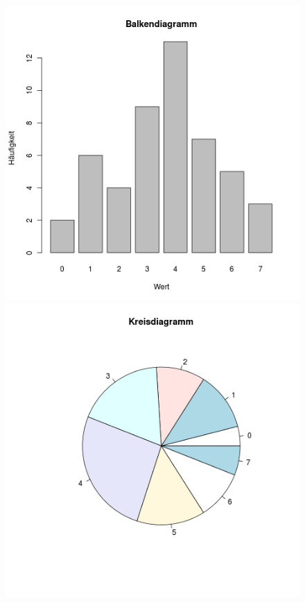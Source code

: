 \begin{figure}[h]
  \begin{minipage}[b]{0.5\linewidth}
    \centering
    \includegraphics[width=1\linewidth]{balkendiagramm.png}
  \end{minipage}
  \begin{minipage}[b]{0.5\linewidth}
    \centering
    \includegraphics[width=1\linewidth]{kreisdiagramm.png}	
  \end{minipage}
\end{figure}

